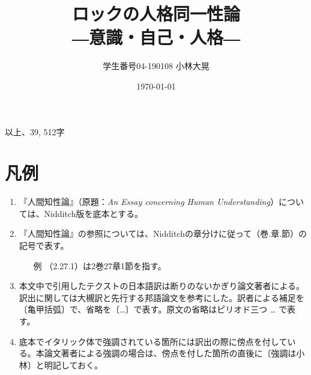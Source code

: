 \documentclass[a4j,oneside]{jsbook}
\title{ロックの人格同一性論\\ \――意識・自己・人格\――}
\author{学生番号04-190108 小林大晃}
\date{\today}
\begin{document}
\maketitle
\tableofcontents
\begin{flushright} 
以上、39, 512字
\end{flushright}
\newpage
\chapter*{
凡例
}
\begin{enumerate}
\item『人間知性論』（原題：{\itshape An Essay concerning Human Understanding}）については、Nidditch版を底本とする。
\item『人間知性論』の参照については、Nidditchの章分けに従って（巻.章.節）の記号で表す。
\begin{itemize}
\item[例]（2.27.1）は2巻27章1節を指す。
\end{itemize}
\item 本文中で引用したテクストの日本語訳は断りのないかぎり論文著者による。訳出に関しては大槻訳と先行する邦語論文を参考にした。訳者による補足を〔亀甲括弧〕で、省略を〔…〕で表す。原文の省略はピリオド三つ … で表す。
\item 底本でイタリック体で強調されている箇所には訳出の際に傍点を付している。本論文著者による強調の場合は、傍点を付した箇所の直後に〔強調は小林〕と明記しておく。
\end{enumerate}
\end{document}
